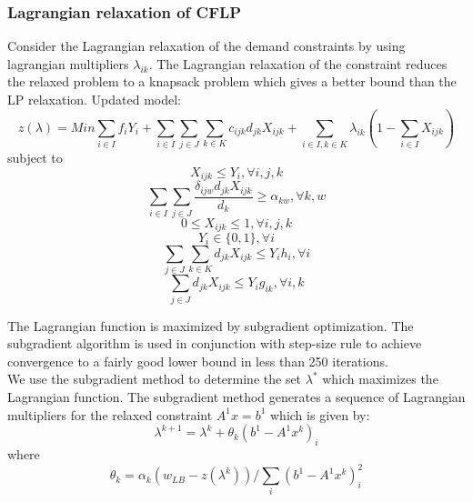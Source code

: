 \documentclass[12pt]{article}
\numberwithin{equation}{section}
\begin{document}
\subsubsection{Lagrangian relaxation of CFLP}
Consider the Lagrangian relaxation of the demand constraints by using lagrangian multipliers $\lambda_{ik}$. The Lagrangian relaxation of the constraint reduces the relaxed problem to a knapsack problem which gives a better bound than the LP relaxation. Updated model: \\
\begin{equation}
\label{obj}
z(\lambda)= Min \sum_{i\in I}f_{i}Y_{i} + \sum_{i\in I}\sum_{j\in J}\sum_{k\in K}c_{ijk}d_{jk}X_{ijk} + \sum_{i\in I, k\in K}\lambda_{ik}(1-\sum_{i\in I}X_{ijk})
\end{equation}
\hspace{2cm} subject to
\begin{equation}
\label{supply}
X_{ijk} \leq Y_{i},  \forall i,j,k  
\end{equation}
\begin{equation}
\label{compound}
\sum_{i\in I}\sum_{j\in J}\frac{\delta_{ijw}d_{jk}X_{ijk}}{d_k} \geq \alpha_{kw},  \forall k,w  
\end{equation}
\begin{equation}
\label{Fraction}
0 \leq X_{ijk} \leq 1,  \forall i,j,k  
\end{equation}
\begin{equation}
\label{Indicator}
Y_{i} \in \{0,1\}, \forall i 
\end{equation}
\begin{equation}
\label{FacCapacity}
\sum_{j\in J}\sum_{k\in K} d_{jk}X_{ijk} \leq Y_{i}h_{i},    \forall i
\end{equation}
\begin{equation}
\label{PartCapacity}
\sum_{j\in J} d_{jk}X_{ijk} \leq Y_{i}g_{ik},    \forall i,k
\end{equation}

The Lagrangian function is maximized by subgradient optimization. The subgradient algorithm is used in conjunction with step-size rule to achieve convergence to a fairly good lower bound in less than 250 iterations.\\
We use the subgradient method to determine the set $\lambda^{*}$ which maximizes the Lagrangian function. The subgradient method generates a sequence of Lagrangian multipliers for the relaxed constraint $A^{1}x=b^{1}$ which is given by:
$$\lambda^{k+1} = \lambda^{k}+ \theta_{k}(b^{1}-A^{1}x^{k})_{i}$$
where 
$$\theta_{k}=\alpha_{k}(w_{LB}-z(\lambda^{k}))/\sum_{i}(b^{1}-A^{1}x^{k})_{i}^{2}$$
\end{document}
